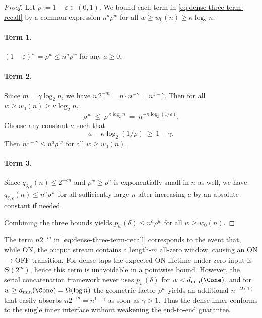 \begin{proof}
Let $\rho:=1-\varepsilon\in(0,1)$.
We bound each term in \eqref{eq:dense-three-term-recall} by a common expression $n^a\rho^w$ for all
$w\ge w_0(n)\ge \kappa\log_2 n$.

\paragraph{Term 1.}
$(1-\varepsilon)^w=\rho^w\le n^a\rho^w$ for any $a\ge 0$.

\paragraph{Term 2.}
Since $m=\gamma\log_2 n$, we have $n\,2^{-m}=n\cdot n^{-\gamma}=n^{1-\gamma}$.
Then for all $w\ge w_0(n)\ge \kappa\log_2 n$,
\[
\rho^{\,w}\ \le\ \rho^{\,\kappa\log_2 n}
\ =\ n^{-\kappa\log_2(1/\rho)}.
\]
Choose any constant $a$ such that
\[
a - \kappa\log_2(1/\rho)\ \ge\ 1-\gamma.
\]
Then $n^{1-\gamma}\le n^{a}\rho^{\,w}$ for all $w\ge w_0(n)$.

\paragraph{Term 3.}
Since $q_{\delta,\varepsilon}(n)\le 2^{-cn}$ and $\rho^w\ge \rho^n$ is exponentially small in $n$ as well,
we have $q_{\delta,\varepsilon}(n)\le n^{a}\rho^{\,w}$ for all sufficiently large $n$ after increasing $a$ by an absolute constant if needed.

Combining the three bounds yields $p_w(\delta)\le n^a\rho^w$ for all $w\ge w_0(n)$.
\end{proof}

\begin{remark}
\label{rem:dense-off-harmless}
The term $n2^{-m}$ in \eqref{eq:dense-three-term-recall} corresponds to the event that, while ON, the output stream
contains a length-$m$ all-zero window, causing an ON$\to$OFF transition.
For dense taps the expected ON lifetime under zero input is $\Theta(2^m)$, hence this term is unavoidable in a pointwise bound.
However, the serial concatenation framework never uses $p_w(\delta)$ for $w<d_{\min}(\Cone)$,
and for $w\ge d_{\min}(\Cone)=\Omega(\log n)$ the geometric factor $\rho^w$ yields an additional $n^{-\Omega(1)}$
that easily absorbs $n2^{-m}=n^{1-\gamma}$ as soon as $\gamma>1$.
Thus the dense inner conforms to the single inner interface without weakening the end-to-end guarantee.
\end{remark}

